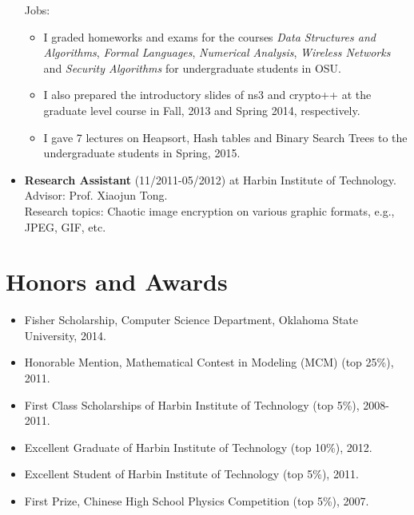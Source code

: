 \documentclass{article}
\begin{document}
\begin{itemize}
Jobs: 
	\begin{itemize}
	\item I graded homeworks and exams for the courses {\it Data Structures and Algorithms}, {\it Formal Languages}, {\it Numerical Analysis}, {\it Wireless Networks} and {\it Security Algorithms} for undergraduate students in OSU. 

	\item I also prepared the introductory slides of ns3 and crypto++ at the graduate level course in Fall, 2013 and Spring 2014, respectively.

	\item I gave 7 lectures on Heapsort, Hash tables and Binary Search Trees to the undergraduate students in Spring, 2015.
	\end{itemize}

\item {\bf Research Assistant} (11/2011-05/2012) at Harbin Institute of Technology.\\
Advisor: Prof. Xiaojun Tong.\\
Research topics: Chaotic image encryption on various graphic formats, e.g., JPEG, GIF, etc.
\end{itemize}

\section{{Honors and Awards}}
\begin{itemize}
\item Fisher Scholarship, Computer Science Department, Oklahoma State University, 2014.
\item Honorable Mention, Mathematical Contest in Modeling (MCM) (top 25\%), 2011.
\item First Class Scholarships of Harbin Institute of Technology (top 5\%), 2008-2011.
\item Excellent Graduate of Harbin Institute of Technology (top 10\%), 2012.
\item Excellent Student of Harbin Institute of Technology (top 5\%), 2011.
\item First Prize, Chinese High School Physics Competition (top 5\%), 2007.
\end{itemize}
\end{document}
